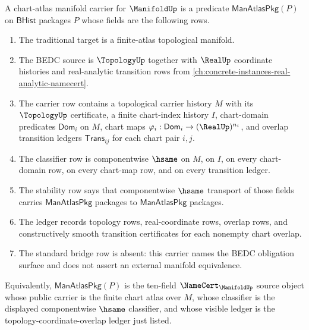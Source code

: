 \begin{definition}
\label{def:manifold-chart-atlas-carrier}
A chart-atlas manifold carrier for $\ManifoldUp$ is a predicate
$\mathsf{ManAtlasPkg}(P)$ on $\mathsf{BHist}$ packages $P$ whose fields are the
following rows.
\begin{enumerate}
\item The traditional target is a finite-atlas topological manifold.
\item The BEDC source is $\TopologyUp$ together with $\RealUp$ coordinate
histories and real-analytic transition rows from
\autoref{ch:concrete-instances-real-analytic-namecert}.
\item The carrier row contains a topological carrier history $M$ with its
$\TopologyUp$ certificate, a finite chart-index history $I$, chart-domain
predicates $\mathsf{Dom}_i$ on $M$, chart maps
$\varphi_i:\mathsf{Dom}_i\to(\RealUp)^{n_i}$, and overlap transition ledgers
$\mathsf{Trans}_{ij}$ for each chart pair $i,j$.
\item The classifier row is componentwise $\hsame$ on $M$, on $I$, on every
chart-domain row, on every chart-map row, and on every transition ledger.
\item The stability row says that componentwise $\hsame$ transport of those
fields carries $\mathsf{ManAtlasPkg}$ packages to
$\mathsf{ManAtlasPkg}$ packages.
\item The ledger records topology rows, real-coordinate rows, overlap rows, and
constructively smooth transition certificates for each nonempty chart overlap.
\item The standard bridge row is absent: this carrier names the BEDC
obligation surface and does not assert an external manifold equivalence.
\end{enumerate}
Equivalently, $\mathsf{ManAtlasPkg}(P)$ is the ten-field
$\NameCert_{\ManifoldUp}$ source object whose public carrier is the finite
chart atlas over $M$, whose classifier is the displayed componentwise
$\hsame$ classifier, and whose visible ledger is the topology-coordinate-overlap
ledger just listed.
\end{definition}

